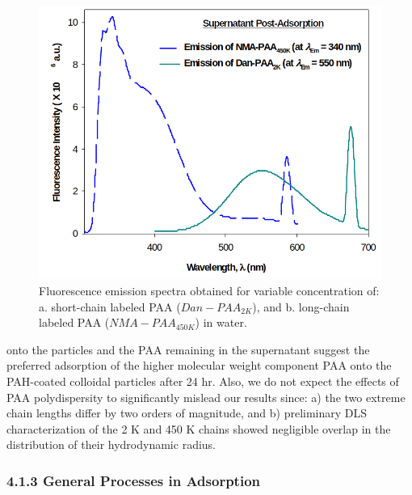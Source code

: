 \documentclass[journal=mamobx,manuscript=article]{achemso}
\begin{document}
\begin{figure}[H]
\includegraphics[scale=1.75]{fig6.png}
\caption{Fluorescence emission spectra obtained for variable concentration of: a. short-chain labeled PAA ($Dan-PAA_{2K}$), and b. long-chain labeled PAA ($NMA-PAA_{450K}$) in water.}
\label{figure 6}
\end{figure}


onto the particles and the PAA remaining in the supernatant suggest the preferred adsorption of the higher molecular weight component PAA onto the PAH-coated colloidal particles after 24 hr.  Also, we do not expect the effects of PAA polydispersity to significantly mislead our results since: a) the two extreme chain lengths differ by two orders of magnitude, and b) preliminary DLS characterization of the 2 K and 450 K chains showed negligible overlap in the distribution of their hydrodynamic radius.

\subsubsection{4.1.3 General Processes in Adsorption}
\end{document}
